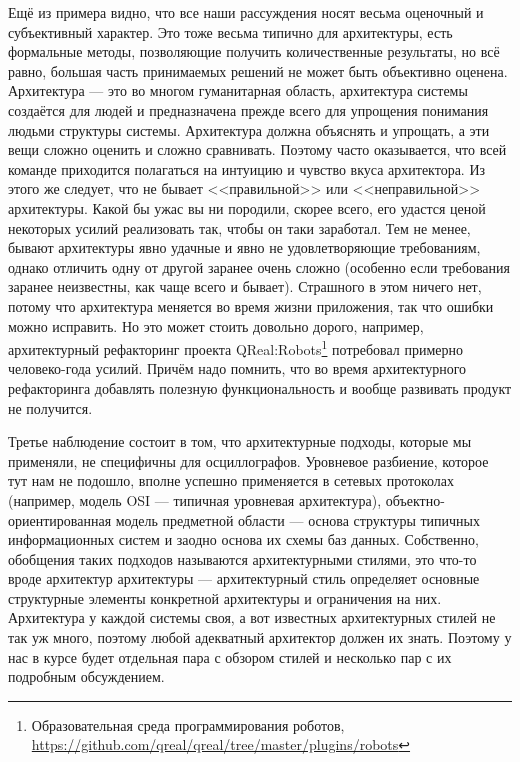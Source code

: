 \documentclass[a5paper]{article}
\begin{document}
Ещё из примера видно, что все наши рассуждения носят весьма оценочный и субъективный характер. Это тоже весьма типично для архитектуры, есть формальные методы, позволяющие получить количественные результаты, но всё равно, большая часть принимаемых решений не может быть объективно оценена. Архитектура --- это во многом гуманитарная область, архитектура системы создаётся для людей и предназначена прежде всего для упрощения понимания людьми структуры системы. Архитектура должна объяснять и упрощать, а эти вещи сложно оценить и сложно сравнивать. Поэтому часто оказывается, что всей команде приходится полагаться на интуицию и чувство вкуса архитектора. Из этого же следует, что не бывает <<правильной>> или <<неправильной>> архитектуры. Какой бы ужас вы ни породили, скорее всего, его удастся ценой некоторых усилий реализовать так, чтобы он таки заработал. Тем не менее, бывают архитектуры явно удачные и явно не удовлетворяющие требованиям, однако отличить одну от другой заранее очень сложно (особенно если требования заранее неизвестны, как чаще всего и бывает). Страшного в этом ничего нет, потому что архитектура меняется во время жизни приложения, так что ошибки можно исправить. Но это может стоить довольно дорого, например, архитектурный рефакторинг проекта QReal:Robots\footnote{Образовательная среда программирования роботов, \url{https://github.com/qreal/qreal/tree/master/plugins/robots}} потребовал примерно человеко-года усилий. Причём надо помнить, что во время архитектурного рефакторинга добавлять полезную функциональность и вообще развивать продукт не получится.

Третье наблюдение состоит в том, что архитектурные подходы, которые мы применяли, не специфичны для осциллографов. Уровневое разбиение, которое тут нам не подошло, вполне успешно применяется в сетевых протоколах (например, модель OSI --- типичная уровневая архитектура), объектно-ориентированная модель предметной области --- основа структуры типичных информационных систем и заодно основа их схемы баз данных. Собственно, обобщения таких подходов называются архитектурными стилями, это что-то вроде архитектур архитектуры --- архитектурный стиль определяет основные структурные элементы конкретной архитектуры и ограничения на них. Архитектура у каждой системы своя, а вот известных архитектурных стилей не так уж много, поэтому любой адекватный архитектор должен их знать. Поэтому у нас в курсе будет отдельная пара с обзором стилей и несколько пар с их подробным обсуждением.
\end{document}
